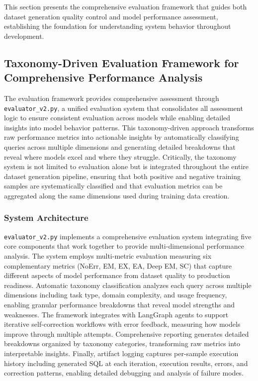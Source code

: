 This section presents the comprehensive evaluation framework that guides both dataset generation quality control and model performance assessment, establishing the foundation for understanding system behavior throughout development.




\subsection{Taxonomy-Driven Evaluation Framework for Comprehensive Performance Analysis}

The evaluation framework provides comprehensive assessment through \texttt{evaluator\_v2.py}, a unified evaluation system that consolidates all assessment logic to ensure consistent evaluation across models while enabling detailed insights into model behavior patterns. This taxonomy-driven approach transforms raw performance metrics into actionable insights by automatically classifying queries across multiple dimensions and generating detailed breakdowns that reveal where models excel and where they struggle. Critically, the taxonomy system is not limited to evaluation alone but is integrated throughout the entire dataset generation pipeline, ensuring that both positive and negative training samples are systematically classified and that evaluation metrics can be aggregated along the same dimensions used during training data creation.

\subsubsection{System Architecture}

\texttt{evaluator\_v2.py} implements a comprehensive evaluation system integrating five core components that work together to provide multi-dimensional performance analysis. The system employs multi-metric evaluation measuring six complementary metrics (NoErr, EM, EX, EA, Deep EM, SC) that capture different aspects of model performance from dataset quality to production readiness. Automatic taxonomy classification analyzes each query across multiple dimensions including task type, domain complexity, and usage frequency, enabling granular performance breakdowns that reveal model strengths and weaknesses. The framework integrates with LangGraph agents to support iterative self-correction workflows with error feedback, measuring how models improve through multiple attempts. Comprehensive reporting generates detailed breakdowns organized by taxonomy categories, transforming raw metrics into interpretable insights. Finally, artifact logging captures per-sample execution history including generated SQL at each iteration, execution results, errors, and correction patterns, enabling detailed debugging and analysis of failure modes.

